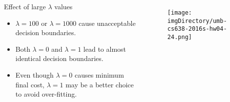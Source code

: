 \documentclass[aspectratio=169]{beamer}
\begin{document}
\begin{slide}

	\begin{columns}

	\begin{block}{Effect of large $\lambda$ values}
	\begin{itemize}
	\item $\lambda = 100$ or $\lambda = 1000$ cause unacceptable decision boundaries.
	\item Both $\lambda = 0$ and $\lambda = 1$ lead to almost identical decision boundaries.
	\item Even though $\lambda = 0$ causes minimum final cost, $\lambda = 1$ may be a better choice to avoid over-fitting.
	\end{itemize}
	\end{block}

	\begin{figure}
	\texttt{[image: \\imgDirectory/umb-cs638-2016s-hw04-24.png]}
	\end{figure}

	\end{columns}

\end{slide}
\end{document}
